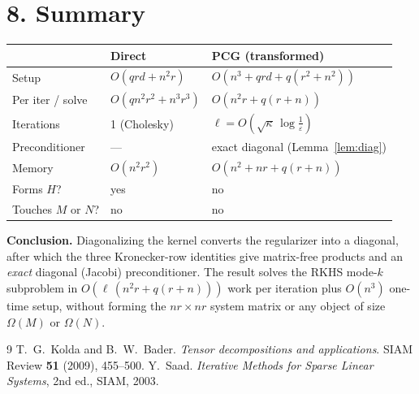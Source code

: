 \documentclass[11pt]{article}
\begin{document}
\section*{8. Summary}

\begin{center}\small
\begin{tabular}{@{}lll@{}}\toprule
 & Direct & PCG (transformed) \\\midrule
Setup & $O(qrd+n^2r)$ & $O(n^3+qrd+q(r^2+n^2))$ \\
Per iter / solve & $O(qn^2r^2+n^3r^3)$ & $O(n^2r+q(r+n))$ \\
Iterations & 1 (Cholesky) & $\ell=O(\sqrt{\kappa}\,\log\tfrac1\varepsilon)$ \\
Preconditioner & --- & exact diagonal (Lemma~\ref{lem:diag}) \\
Memory & $O(n^2r^2)$ & $O(n^2+nr+q(r+n))$ \\
Forms $H$? & yes & no \\
Touches $M$ or $N$? & no & no \\
\bottomrule\end{tabular}\end{center}

\medskip
\noindent\textbf{Conclusion.} Diagonalizing the kernel converts the
regularizer into a diagonal, after which the three Kronecker-row identities
give matrix-free products and an \emph{exact} diagonal (Jacobi) preconditioner.
The result solves the RKHS mode-$k$ subproblem in
$O(\ell\,(n^2r+q(r+n)))$ work per iteration plus $O(n^3)$ one-time setup,
without forming the $nr\times nr$ system matrix or any object of size
$\Omega(M)$ or $\Omega(N)$.

\begin{thebibliography}{9}
 T.~G.~Kolda and B.~W.~Bader.
  \emph{Tensor decompositions and applications}.
  SIAM Review \textbf{51} (2009), 455--500.
 Y.~Saad.
  \emph{Iterative Methods for Sparse Linear Systems}, 2nd ed., SIAM, 2003.
\end{thebibliography}

\endgroup
\end{document}

